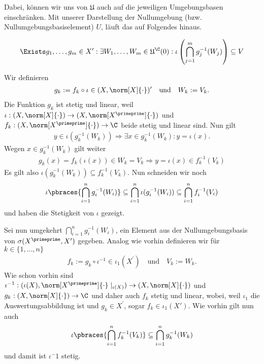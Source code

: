 \begin{solution}
\begin{enumerate}[label = (\arabic*)]
  Dabei, können wir uns von $\mathfrak{U}$ auch auf die jeweiligen Umgebungsbasen einschränken.
  Mit unserer Darstellung der Nullumgebung (bzw. Nullumgebungsbasiselement) $U$, läuft das auf Folgendes hinaus.

  \begin{align*}
    \Exists g_1, \dots, g_m \in X^{\prime}:
    \exists W_1, \dots, W_m \in \mathfrak{U}^\C(0):
    \iota\left(\bigcap_{j=1}^m g_j^{-1}(W_j)\right) \subseteq V
  \end{align*}

  Wir definieren 
  \begin{align*}
    g_k := f_k \circ \iota \in (X,\norm[X]{\cdot})^\prime \quad \textrm{und} \quad W_k := V_k.
  \end{align*}
  Die Funktion $g_k$ ist stetig und linear, weil $\iota: (X, \norm[X]{\cdot}) \to (X, \norm[X^\primeprime]{\cdot})$ und $f_k: (X, \norm[X^\primeprime]{\cdot}) \to \C$ beide stetig und linear sind. 
  Nun gilt 
  \begin{align*}
    y \in \iota(g_k^{-1}(W_k)) \Rightarrow \exists x \in g_k^{-1}(W_k): y = \iota(x).
  \end{align*}
  Wegen $x \in g_k^{-1}(W_k)$ gilt weiter
  \begin{align*}
    g_k(x) = f_k(\iota(x)) \in W_k = V_k \Rightarrow y = \iota(x) \in f_k^{-1}(V_k) 
  \end{align*}
  Es gilt also $\iota(g_k^{-1}(W_k)) \subseteq f_k^{-1}(V_k)$. Nun schneiden wir noch
  \begin{align*}
    \iota\pbraces{\bigcap_{i = 1}^n g_i^{-1}(W_i)} \subseteq \bigcap_{i = 1}^n \iota(g_i^{-1}(W_i)) \subseteq \bigcap_{i=1}^n f_i^{-1}(V_i)
  \end{align*}
  und haben die Stetigkeit von $\iota$ gezeigt.

  Sei nun umgekehrt $\bigcap_{i = 1}^n g_i^{-1}(W_i)$, ein Element aus der Nullumgebungsbasis von $\sigma(X^\primeprime, X^\prime)$ gegeben. Analog wie vorhin definieren wir für $k \in \{1, \dots, n\}$
  \begin{align*}
    f_k := g_k \circ \iota^{-1} \in \iota_1(X^\prime) \quad \textrm{und} \quad V_k := W_k.
  \end{align*}
  Wie schon vorhin sind $\iota^{-1}: (\iota(X), \norm[X^\primeprime]{\cdot}\mid_{\iota(X)}) \to (X, \norm[X]{\cdot})$ und $g_k: (X, \norm[X]{\cdot}) \to \C$ und daher auch $f_k$ stetig und linear, wobei, weil $\iota_1$ die Auswertungsabbildung ist und $g_k \in X^\prime$, sogar $f_k \in \iota_1(X\prime)$. Wie vorhin gilt nun auch 
  \begin{align*}
    \iota \pbraces{\bigcap_{i = 1}^n f_k^{-1}(V_k)} \subseteq \bigcap_{i = 1}^n g_k^{-1}(W_k)
  \end{align*}
  und damit ist $\iota^-1$ stetig.


\end{enumerate}
\end{solution}
